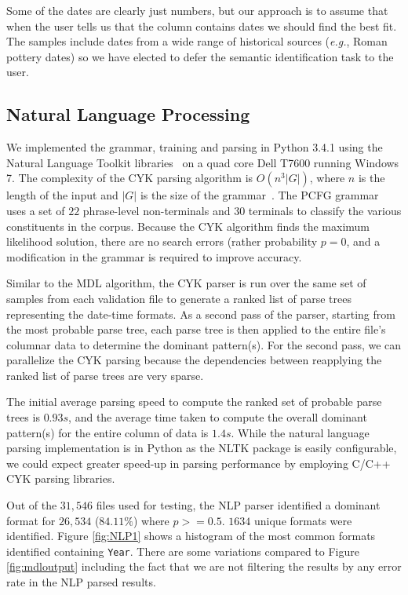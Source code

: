 Some of the dates are clearly just numbers, but our approach is to assume that when the user tells us that the column contains dates we should find the best fit. 
The samples include dates from a wide range of historical sources (\textit{e.g.}, Roman pottery dates) so we have elected to defer the semantic identification task to the user.

\subsection{Natural Language Processing}

We implemented the grammar, training and parsing in Python 3.4.1 using the Natural Language Toolkit libraries~\cite{nltk} on a quad core Dell T7600 running Windows 7. The complexity of the CYK parsing algorithm is $O(n^{3}|G|)$, where $n$ is the length of the input and $|G|$ is the size of the grammar~\cite{Younger67}. The PCFG grammar uses a set of $22$ phrase-level non-terminals and $30$ terminals to classify the various constituents in the corpus. Because the CYK algorithm finds the maximum likelihood solution, there are no search errors (rather probability $p = 0$, and a modification in the grammar is required to improve accuracy.

Similar to the MDL algorithm, the CYK parser is run over the same set of samples from each validation file to generate a ranked list of parse trees representing the date-time formats. As a second pass of the parser, starting from the most probable parse tree, each parse tree is then applied to the entire file's columnar data to determine the dominant pattern(s). For the second pass, we can parallelize the CYK parsing because the dependencies between reapplying the ranked list of parse trees are very sparse.

The initial average parsing speed to compute the ranked set of probable parse trees is $0.93s$, and the average time taken to compute the overall dominant pattern(s) for the entire column of data is $1.4s$. While the natural language parsing implementation is in Python as the NLTK package is easily configurable, we could expect greater speed-up in parsing performance by employing C/C++ CYK parsing libraries.


Out of the $31,546$ files used for testing, the NLP parser identified a dominant format for $26, 534$ ($84.11\%$) where $p >= 0.5$. $1634$ unique formats were identified. Figure \ref{fig:NLP1} shows a histogram of the most common formats identified containing \texttt{Year}. There are some variations compared to Figure \ref{fig:mdloutput} including the fact that we are not filtering the results by any error rate in the NLP parsed results.

